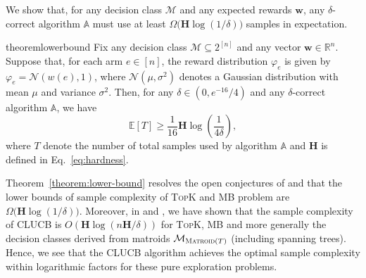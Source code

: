 \documentclass{article}
\newcommand{\Algorithm}{{\small \textsf{CLUCB}}\xspace}
\newcommand{\Rew}{\varphi}
\newcommand{\E}{\mathbb E}
\newcommand{\M}{\mathcal M}
\newcommand{\B}{\mathcal B}
\newcommand{\RR}{\mathbb R}
\DeclareMathOperator{\rank}{width}
\newcommand{\MultiIdent}{\textsc{TopK}\xspace}
\newcommand{\MultiBandit}{\textsc{MB}\xspace}
\newcommand{\Matroid}{\textsc{Matroid}\xspace}
\newcommand{\Match}{\textsc{Match}\xspace}
\newcommand{\Path}{\textsc{Path}\xspace}
\renewcommand{\vec}[1]{\boldsymbol{#1}}
\begin{document}
We show that, for any decision class $\M$ and any expected rewards $\vec w$, any $\delta$-correct algorithm $\mathbb A$ must use at least $\Omega\big(\mathbf H \log(1/\delta) \big)$ samples in expectation.
\begin{restatable}{theorem}{lowerbound}
Fix any decision class $\M\subseteq 2^{[n]}$ and any vector $\vec w \in \RR^n$.
Suppose that, for each arm $e\in [n]$, the reward distribution $\Rew_e$ is given by $\Rew_e=\mathcal N(w(e),1)$, where $\mathcal N(\mu, \sigma^2)$ denotes a Gaussian distribution with mean $\mu$ and variance $\sigma^2$. 
Then, for any $\delta \in (0,e^{-16}/4)$ and any $\delta$-correct algorithm $\mathbb A$, we have
\begin{equation}
\label{eq:lower-bound}
\E[T] \ge \frac{1}{16} \mathbf H \log\left(\frac{1}{4\delta}\right),
\end{equation}
where 
$T$ denote the number of total samples used by algorithm $\mathbb A$ and
$\mathbf H$ is defined in Eq.~\eqref{eq:hardness}.
\label{theorem:lower-bound}
\end{restatable}

Theorem~\ref{theorem:lower-bound} resolves the open conjectures of \citet{kalyanakrishnan2012pac} and \citet{bubeck2013multiple} that the lower bounds of sample complexity of \MultiIdent and \MultiBandit problem are $\Omega\big(\mathbf H\log(1/\delta)\big)$.
Moreover, in  and , we have shown that the sample complexity of \Algorithm is $O(\mathbf H\log(n\mathbf H/\delta))$ for \MultiIdent, \MultiBandit and more generally the decision classes derived from matroids $\M_{\Matroid(T)}$ (including spanning trees).
Hence, we see that the \Algorithm algorithm achieves the optimal sample complexity within logarithmic factors for these pure exploration problems.
\end{document}
